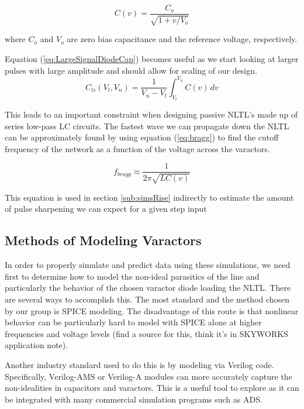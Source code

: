 \documentclass[journal]{IEEEtran} \usepackage[english]{babel}
\begin{document}
\begin{equation}\label{eq:nonlincap}
C(v) = \frac{C_{o}}{\sqrt{1+v/V_{o}}}
\end{equation}


where $C_{o}$ and $V_{o}$ are zero bias capacitance and the reference voltage,
respectively.

Equation (\ref{eq:LargeSignalDiodeCap}) becomes useful as we start looking at
larger pulses with large amplitude and should allow for scaling of our design.
\begin{equation}\label{eq:LargeSignalDiodeCap}
C_{ls}(V_{l},V_{n}) = \frac{1}{V_{n}-V_{l}}\int_{V_{l}}^{V_{n}}C(v)\, dv
\end{equation}

This leads to an important constraint when designing passive NLTL's made up of
series low-pass LC circuits. The fastest wave we can propagate down the NLTL can
be approximately found by using equation (\ref{eq:bragg}) to find the cutoff
frequency of the network as a function of the voltage across the varactors. 

\begin{equation}\label{eq:bragg}
	f_{bragg} \approx \frac{1}{2\pi{}\sqrt{LC(v)}}	
\end{equation}

This equation is used in section \ref{sub:simsRise} indirectly to estimate the
amount of pulse sharpening we can expect for a given step input


\subsection{Methods of Modeling Varactors}\label{sub:VaracModeling}

In order to properly simulate and predict data using these simulations, we
need first to determine how to model the non-ideal parasitics of the line
and particularly the behavior of the chosen varactor diode loading the NLTL.
There are several ways to accomplish this. The most standard and the method
chosen by our group is SPICE modeling. The disadvantage of this route is
that nonlinear behavior can be particularly hard to model with SPICE alone
at higher frequencies and voltage levels (find a source for this, think it's
in SKYWORKS application note).

Another industry standard used to do this is by modeling via Verilog code.
Specifically, Verilog-AMS or Verilog-A modules can more accurately capture
the non-idealities in capacitors and varactors. This is a useful tool to
explore as it can be integrated with many commercial simulation programs
such as ADS.
    
\end{document}
